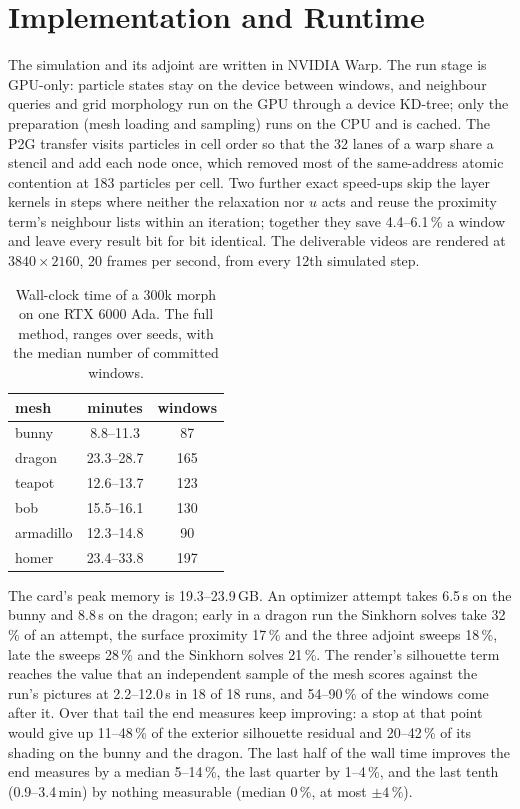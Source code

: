 \section{Implementation and Runtime}
\label{ch4:sec_implementation}
The simulation and its adjoint are written in NVIDIA Warp. The run stage is GPU-only: particle states stay on the device
between windows, and neighbour queries and grid morphology run on the GPU through a device KD-tree; only the preparation
(mesh loading and sampling) runs on the CPU and is cached. The P2G transfer visits particles in cell order so that the 32
lanes of a warp share a stencil and add each node once, which removed most of the same-address atomic contention at 183
particles per cell. Two further exact speed-ups skip the layer kernels in steps where neither the relaxation nor $u$ acts
and reuse the proximity term's neighbour lists within an iteration; together they save 4.4--6.1\,\% a window and leave every
result bit for bit identical. The deliverable videos are rendered at $3840\times2160$, 20 frames per second, from every 12th
simulated step.

\begin{table}[t]
\centering
\footnotesize
\caption{Wall-clock time of a 300k morph on one RTX 6000 Ada. \textmd{The full method, ranges over seeds, with the median
number of committed windows.}}
\label{ch4:tab_runtime}
\begin{tabular}{lcc}
\toprule
mesh & minutes & windows \\
\midrule
bunny & 8.8--11.3 & 87 \\
dragon & 23.3--28.7 & 165 \\
teapot & 12.6--13.7 & 123 \\
bob & 15.5--16.1 & 130 \\
armadillo & 12.3--14.8 & 90 \\
homer & 23.4--33.8 & 197 \\
\bottomrule
\end{tabular}
\end{table}

The card's peak memory is 19.3--23.9\,GB. An optimizer attempt takes 6.5\,s on the bunny and 8.8\,s on the dragon; early in a
dragon run the Sinkhorn solves take 32\,\% of an attempt, the surface proximity 17\,\% and the three adjoint sweeps 18\,\%,
late the sweeps 28\,\% and the Sinkhorn solves 21\,\%. The render's silhouette term reaches the value that an independent
sample of the mesh scores against the run's pictures at 2.2--12.0\,s in 18 of 18 runs, and 54--90\,\% of the windows come
after it. Over that tail the end measures keep improving: a stop at that point would give up 11--48\,\% of the exterior
silhouette residual and 20--42\,\% of its shading on the bunny and the dragon. The last half of the wall time improves the end
measures by a median 5--14\,\%, the last quarter by 1--4\,\%, and the last tenth (0.9--3.4\,min) by nothing measurable (median
0\,\%, at most $\pm4$\,\%).

